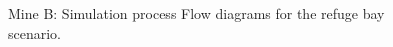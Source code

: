 \begin{appendices}
	\begin{figure}[h]
		\centering
		\caption{Mine B: Simulation process Flow diagrams for the refuge bay scenario.}
		\label{fig: Refuge bay layout}
	\end{figure}	


\end{appendices}

